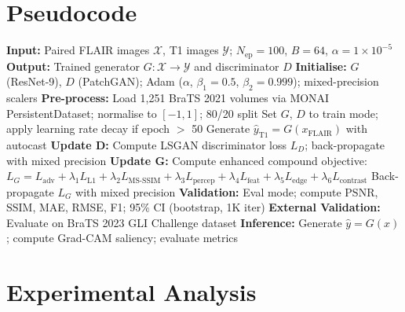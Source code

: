 \documentclass[runningheads]{llncs}
\begin{document}
\section{Pseudocode}
\vspace{-0.3em}
\begin{algorithm}[!htbp]
\small
\caption{Cross-Modal FLAIR$\rightarrow$T1 MRI Translation with Enhanced Pix2Pix GAN}
\begin{algorithmic}[1]
    \STATE \textbf{Input:} Paired FLAIR images $\mathcal{X}$, T1 images $\mathcal{Y}$; $N_{\text{ep}}=100$, $B=64$, $\alpha=1\times10^{-5}$
    \STATE \textbf{Output:} Trained generator $G: \mathcal{X}\rightarrow\mathcal{Y}$ and discriminator $D$
    \STATE \textbf{Initialise:} $G$ (ResNet-9), $D$ (PatchGAN); Adam ($\alpha$, $\beta_1=0.5$, $\beta_2=0.999$); mixed-precision scalers
    \STATE \textbf{Pre-process:} Load 1,251 BraTS 2021 volumes via MONAI PersistentDataset; normalise to $[-1,1]$; 80/20 split
        \STATE Set $G$, $D$ to train mode; apply learning rate decay if epoch $>$ 50
            \STATE Generate $\hat{y}_{\text{T1}} = G(x_{\text{FLAIR}})$ with autocast
            \STATE \textbf{Update D:} Compute LSGAN discriminator loss $L_D$; back-propagate with mixed precision
            \STATE \textbf{Update G:} Compute enhanced compound objective:
            \STATE \hspace{2em} $L_G = L_{\text{adv}} + \lambda_1 L_{\text{L1}} + \lambda_2 L_{\text{MS-SSIM}} + \lambda_3 L_{\text{percep}} + \lambda_4 L_{\text{feat}} + \lambda_5 L_{\text{edge}} + \lambda_6 L_{\text{contrast}}$
            \STATE \hspace{2em} Back-propagate $L_G$ with mixed precision
        \ENDFOR
        \STATE \textbf{Validation:} Eval mode; compute PSNR, SSIM, MAE, RMSE, F1; 95\% CI (bootstrap, 1K iter)
    \ENDFOR
    \STATE \textbf{External Validation:} Evaluate on BraTS 2023 GLI Challenge dataset
    \STATE \textbf{Inference:} Generate $\hat{y} = G(x)$; compute Grad-CAM saliency; evaluate metrics
\end{algorithmic}
\end{algorithm}
\vspace{-0.3em}
\section{Experimental Analysis}
\vspace{-0.2em}
\end{document}
